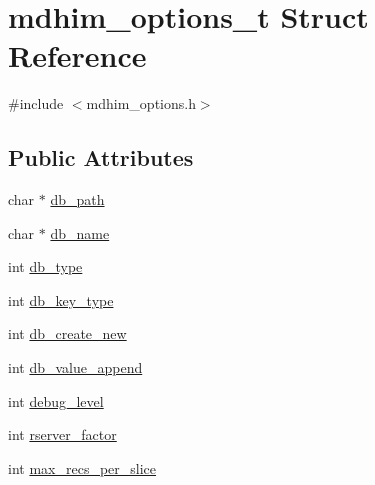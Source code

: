\hypertarget{structmdhim__options__t}{\section{mdhim\-\_\-options\-\_\-t Struct Reference}
\label{structmdhim__options__t}
}


{\ttfamily \#include $<$mdhim\-\_\-options.\-h$>$}

\subsection*{Public Attributes}
\begin{DoxyCompactItemize}
\item 
char $\ast$ \hyperlink{structmdhim__options__t_a5fcabb5595557c070b2a5cca4b71ba77}{db\-\_\-path}
\item 
char $\ast$ \hyperlink{structmdhim__options__t_ac29291a74e33823a7afe5db3e4bc9ab4}{db\-\_\-name}
\item 
int \hyperlink{structmdhim__options__t_aca30ea829be8cddac409433a2cc42465}{db\-\_\-type}
\item 
int \hyperlink{structmdhim__options__t_adb5b53114b9874d0da9c1ac6831af650}{db\-\_\-key\-\_\-type}
\item 
int \hyperlink{structmdhim__options__t_a2b60766ae51f27b1b6c6eea5a1dd47b5}{db\-\_\-create\-\_\-new}
\item 
int \hyperlink{structmdhim__options__t_a6bad7d9c2713672eaed657aac45fae5c}{db\-\_\-value\-\_\-append}
\item 
int \hyperlink{structmdhim__options__t_a4844203cf92b3d109303153db34114dd}{debug\-\_\-level}
\item 
int \hyperlink{structmdhim__options__t_a63c13fdd85eb946ac15fdeb81df96ad8}{rserver\-\_\-factor}
\item 
int \hyperlink{structmdhim__options__t_a46baf3b15d0be9c6d0cab276626e2a6e}{max\-\_\-recs\-\_\-per\-\_\-slice}
\end{DoxyCompactItemize}


